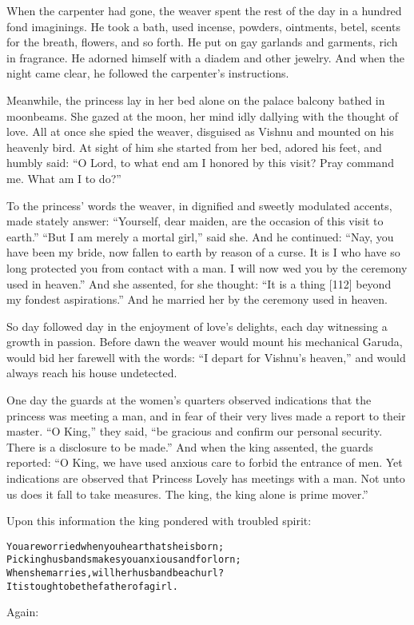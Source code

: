 \documentclass{article}
\renewenvironment{verbatim}{\begin{alltt}\normalfont\begin{centering}}{\end{centering}\end{alltt}}
\begin{document}
When the carpenter had gone, the weaver spent the rest of the day
in a hundred fond imaginings. He took a bath, used incense,
powders, ointments, betel, scents for the breath, flowers, and so
forth. He put on gay garlands and garments, rich in fragrance. He
adorned himself with a diadem and other jewelry. And when the night
came clear, he followed the carpenter's instructions.

Meanwhile, the princess lay in her bed alone on the palace balcony
bathed in moonbeams. She gazed at the moon, her mind idly dallying
with the thought of love. All at once she spied the weaver,
disguised as Vishnu and mounted on his heavenly bird. At sight of
him she started from her bed, adored his feet, and humbly said:
``O Lord, to what end am I honored by this visit? Pray command me. What am I to do?''

To the princess' words the weaver, in dignified and sweetly
modulated accents, made stately answer:
``Yourself, dear maiden, are the occasion of this visit to earth.''
``But I am merely a mortal girl,'' said she. And he continued:
``Nay, you have been my bride, now fallen to earth by reason of a curse. It is I who have so long protected you from contact with a man. I will now wed you by the ceremony used in heaven.''
And she assented, for she thought:
``It is a thing [112] beyond my fondest aspirations.'' And he
married her by the ceremony used in heaven.

So day followed day in the enjoyment of love's delights, each day
witnessing a growth in passion. Before dawn the weaver would mount
his mechanical Garuda, would bid her farewell with the words:
``I depart for Vishnu's heaven,'' and would always reach his house
undetected.

One day the guards at the women's quarters observed indications
that the princess was meeting a man, and in fear of their very
lives made a report to their master. ``O King,'' they said,
``be gracious and confirm our personal security. There is a disclosure to be made.''
And when the king assented, the guards reported:
``O King, we have used anxious care to forbid the entrance of men. Yet indications are observed that Princess Lovely has meetings with a man. Not unto us does it fall to take measures. The king, the king alone is prime mover.''

Upon this information the king pondered with troubled spirit:

\begin{verbatim}
You are worried when you hear that she is born;
Picking husbands makes you anxious and forlorn;
When she marries, will her husband be a churl?
It is tough to be the father of a girl.
\end{verbatim}
Again:
\end{document}
